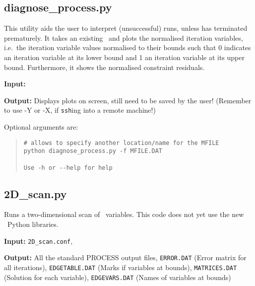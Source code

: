 \subsection{diagnose\_process.py}

This utility aids the user to interpret (unsuccessful) \process\/ runs, unless
\process\/ has terminated prematurely. It takes an existing \mfile\ and plots
the normalised iteration variables, i.e.\ the iteration variable values
normalised to their bounds such that 0 indicates an iteration variable at its
lower bound and 1 an iteration variable at its upper bound. Furthermore, it
shows the normalised constraint residuals.

\begin{description}
\item{\textbf{Input:}}
 \mfile
                                
\item{\textbf{Output:}}
  Displays plots on screen, still need to be saved by the user! (Remember to
  use -Y or -X, if \texttt{ssh}ing into a remote machine!)

\end{description}

Optional arguments are:
\begin{quote}
\begin{verbatim}
# allows to specify another location/name for the MFILE
python diagnose_process.py -f MFILE.DAT

Use -h or --help for help

\end{verbatim}
\end{quote}

\subsection{2D\_scan.py}


Runs a two-dimensional scan of \process\ variables. This code does not yet use
the new \process\ Python libraries.

\begin{description}
\item{\textbf{Input:}}
 \texttt{2D\_scan.conf}, \indat\
                                
\item{\textbf{Output:}} All the standard PROCESS output files,
  \texttt{ERROR.DAT} (Error matrix for all iterations), \texttt{EDGETABLE.DAT}
  (Marks if variables at bounds), \texttt{MATRICES.DAT} (Solution for each
  variable), \texttt{EDGEVARS.DAT} (Names of variables at bounds)
\end{description}

